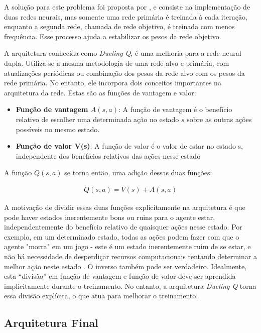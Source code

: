 A solução para este problema foi proposta por \cite{vanhasselt2015deep}, e consiste na implementação de duas redes neurais, mas somente uma rede primária é treinada à cada iteração, enquanto a segunda rede, chamada de rede objetivo, é treinada com menos frequência. Esse processo ajuda a estabilizar os pesos da rede objetivo.

A arquitetura conhecida como \textit{Dueling Q}, é uma melhoria para a rede neural dupla. Utiliza-se a mesma metodologia de uma rede alvo e primária, com atualizações periódicas ou combinação dos pesos da rede alvo com os pesos da rede primária. No entanto, ele incorpora dois conceitos importantes na arquitetura da rede. Estas são as funções de vantagem e valor:

\begin{itemize}
  \item \textbf{Função de vantagem $A(s,a)$}: A função de vantagem é o benefício relativo de escolher uma determinada ação no estado $s$ sobre as outras ações possíveis no mesmo estado.
  \item \textbf{Função de valor V(s)}: A função de valor é o valor de estar no estado s, independente dos benefícios relativos das ações nesse estado
\end{itemize}

A função $Q(s,a)$ se torna então, uma adição dessas duas funções:

\begin{eqnarray}
  Q(s,a) = V(s) + A(s,a)
\end{eqnarray}

A motivação de dividir essas duas funções explicitamente na arquitetura é que pode haver estados inerentemente bons ou ruins para o agente estar, independentemente do benefício relativo de quaisquer ações nesse estado. Por exemplo, em um determinado estado, todas as ações podem fazer com que o agente "morra" em um jogo - este é um estado inerentemente ruim de se estar, e não há necessidade de desperdiçar recursos computacionais tentando determinar a melhor ação neste estado . O inverso também pode ser verdadeiro. Idealmente, esta “divisão” em função de vantagem e função de valor deve ser aprendida implicitamente durante o treinamento. No entanto, a arquitetura \textit{Dueling Q} torna essa divisão explícita, o que atua para melhorar o treinamento.

\subsection{Arquitetura Final} %
\label{ssub:arquiterura_final}

